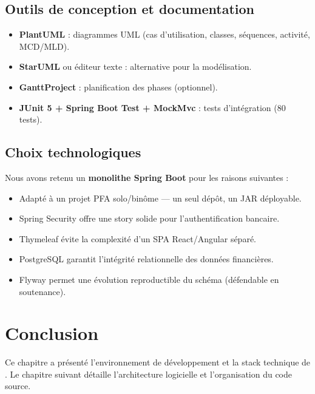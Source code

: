 \subsection{Outils de conception et documentation}

\begin{itemize}[leftmargin=*]
    \item \textbf{PlantUML} : diagrammes UML (cas d'utilisation, classes, séquences, activité, MCD/MLD).
    \item \textbf{StarUML} ou éditeur texte : alternative pour la modélisation.
    \item \textbf{GanttProject} : planification des phases (optionnel).
    \item \textbf{JUnit 5 + Spring Boot Test + MockMvc} : tests d'intégration (80 tests).
\end{itemize}

\subsection{Choix technologiques}

Nous avons retenu un \textbf{monolithe Spring Boot} pour les raisons suivantes :
\begin{itemize}[leftmargin=*]
    \item Adapté à un projet PFA solo/binôme — un seul dépôt, un JAR déployable.
    \item Spring Security offre une story solide pour l'authentification bancaire.
    \item Thymeleaf évite la complexité d'un SPA React/Angular séparé.
    \item PostgreSQL garantit l'intégrité relationnelle des données financières.
    \item Flyway permet une évolution reproductible du schéma (défendable en soutenance).
\end{itemize}

\section{Conclusion}

Ce chapitre a présenté l'environnement de développement et la stack technique de \nomapplication. Le chapitre suivant détaille l'architecture logicielle et l'organisation du code source.
